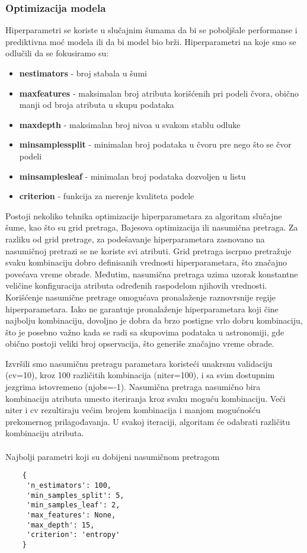 \documentclass[a4paper,12pt]{article}
\begin{document}
\subsubsection{Optimizacija modela}
Hiperparametri se koriste u slučajnim šumama da bi se poboljšale performanse i prediktivna moć modela ili da bi model bio brži.
Hiperparametri na koje smo se odlučili da se fokusiramo su:
\begin{itemize}
    \item \textbf{n\textunderscore estimators} - broj stabala u šumi
    \item \textbf{max\textunderscore features} - maksimalan broj atributa korišćenih pri podeli čvora, obično manji od broja atributa u skupu podataka
    \item \textbf{max\textunderscore depth} - maksimalan broj nivoa u svakom stablu odluke
    \item \textbf{min\textunderscore samples\textunderscore split} - minimalan broj podataka u čvoru pre nego što se čvor podeli
    \item \textbf{min\textunderscore samples\textunderscore leaf} - minimalan broj podataka dozvoljen u listu
    \item \textbf{criterion} - funkcija za merenje kvaliteta podele
\end{itemize}

Postoji nekoliko tehnika optimizacije hiperparametara za algoritam slučajne šume, kao što su grid pretraga, Bajesova optimizacija ili nasumična pretraga. Za razliku od grid pretrage, za podešavanje hiperparametara zasnovano na nasumičnoj pretrazi se ne koriste svi atributi. Grid pretraga iscrpno pretražuje svaku kombinaciju dobro definisanih vrednosti hiperparametara, što značajno povećava vreme obrade. Međutim, nasumična pretraga uzima uzorak konstantne veličine konfiguracija atributa određenih raspodelom njihovih vrednosti. Korišćenje nasumične pretrage omogućava pronalaženje raznovrsnije regije hiperparametara. Iako ne garantuje pronalaženje hiperparametara koji čine najbolju kombinaciju, dovoljno je dobra da brzo postigne vrlo dobru kombinaciju, što je posebno važno kada se radi sa skupovima podataka u astronomiji, gde obično postoji veliki broj opservacija, što generiše značajno vreme obrade.

Izvršili smo nasumičnu pretragu parametara koristeći unakrsnu validaciju (cv=10), kroz 100 različitih kombinacija (n\textunderscore iter=100), i sa svim dostupnim jezgrima istovremeno (n\textunderscore jobs=-1). Nasumična pretraga nasumično bira kombinaciju atributa umesto iteriranja kroz svaku moguću kombinaciju. Veći n\textunderscore iter i cv rezultiraju većim brojem kombinacija i manjom mogućnošću prekomernog prilagođavanja. U svakoj iteraciji, algoritam će odabrati različitu kombinaciju atributa.\\\\
Najbolji parametri koji su dobijeni nasumičnom pretragom
\begin{verbatim}
    {
     'n_estimators': 100,
     'min_samples_split': 5,
     'min_samples_leaf': 2,
     'max_features': None,
     'max_depth': 15,
     'criterion': 'entropy'
    }
\end{verbatim}
\end{document}
